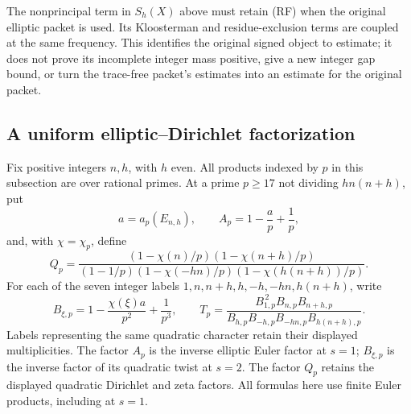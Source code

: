 \documentclass[11pt]{article}
\begin{document}
The nonprincipal term in \(S_h(X)\) above must retain (RF) when
the original elliptic packet is used. Its Kloosterman and
residue-exclusion terms are coupled at the same frequency.
This identifies the original signed object to estimate; it does not
prove its incomplete integer mass positive, give a new integer
gap bound, or turn the trace-free packet's estimates into an
estimate for the original packet.

\subsection{A uniform elliptic--Dirichlet factorization}
Fix positive integers \(n,h\), with \(h\) even. All products indexed
by \(p\) in this subsection are over rational primes. At a prime
\(p\geq17\) not dividing \(hn(n+h)\), put
\[
 a=a_p(E_{n,h}),\qquad
 A_p=1-\frac ap+\frac1p,
\]
and, with \(\chi=\chi_p\), define
\[
 Q_p=\frac{(1-\chi(n)/p)(1-\chi(n+h)/p)}
 {(1-1/p)(1-\chi(-hn)/p)(1-\chi(h(n+h))/p)}.
\]
For each of the seven integer labels
\(1,n,n+h,h,-h,-hn,h(n+h)\), write
\[
 B_{\xi,p}=1-\frac{\chi(\xi)a}{p^2}+\frac1{p^3},\qquad
 T_p=\frac{B_{1,p}^{\,2}B_{n,p}B_{n+h,p}}
 {B_{h,p}B_{-h,p}B_{-hn,p}B_{h(n+h),p}}.
\]
Labels representing the same quadratic character retain their
displayed multiplicities. The factor \(A_p\) is the inverse elliptic
Euler factor at \(s=1\); \(B_{\xi,p}\) is the inverse factor of its
quadratic twist at \(s=2\). The factor \(Q_p\) retains the displayed
quadratic Dirichlet and zeta factors. All formulas here use finite
Euler products, including at \(s=1\).
\end{document}
